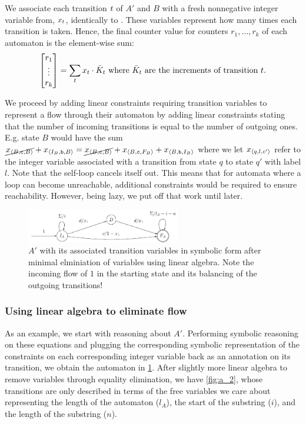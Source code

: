 We associate each transition $t$ of $A'$ and $B$ with a fresh
nonnegative integer variable from, $x_t$, identically to
\cite{generate-parikh-image}. These variables represent how many times each
transition is taken. Hence, the final counter value for counters $r_1, \ldots,
r_k$ of each automaton is the element-wise sum:
\begin{equation}\label{eq:counter-sums}
\begin{bmatrix} 
  r_1 \\
  \vdots\\
  r_k \\
\end{bmatrix} = \sum_t x_t \cdot 
  \bar{K}_t \text{ where $\bar{K}_t$ are the increments of transition $t$}.
\end{equation}

We proceed by adding linear constraints requiring transition variables to
represent a flow through their automaton by adding linear constraints stating
that the number of incoming transitions is equal to the number of outgoing ones.
E.g. state $B$ would have the sum $\cancel{x_{\left\langle B, \texttt{c}, B\right\rangle}} +
x_{\left\langle I_B, \texttt{b}, B\right\rangle} = \cancel{x_{\left\langle B, \texttt{c}, B\right\rangle}}  +
x_{\left\langle B, \texttt{c}, F_B\right\rangle} + x_{\left\langle B, \texttt{b}, I_B\right\rangle}$ where we let
$x_{\left\langle q, l, c'\right\rangle}$ refer to the integer variable associated with a
transition from state $q$ to state $q'$ with label $l$. Note that the self-loop
cancels itself out. This means that for automata where a loop can become
unreachable, additional constraints would be required to ensure reachability.
However, being lazy, we put off that work until later.

\begin{figure}[h]
  \centering 
  \includegraphics[width=0.6\textwidth]{a_1}
  \caption{ $A'$ with its associated transition variables in symbolic form after
  minimal elminiation of variables using linear algebra. Note the incoming flow
  of $1$ in the starting state and its balancing of the outgoing transitions!
  }\label{fig:a_1}
\end{figure}

\subsubsection{Using linear algebra to eliminate flow}
As an example, we start with reasoning about $A'$. Performing symbolic reasoning
on these equations and plugging the corresponding symbolic representation of the
constraints on each corresponding integer variable back as an annotation on its
transition, we obtain the automaton in \cref{fig:a_1}. After slightly more
linear algebra to remove variables through equality elimination, we have
\cref{fig:a_2}, whose transitions are only described in terms of the free
variables we care about representing the length of the automaton ($l_A$), the
start of the substring ($i$), and the length of the substring ($n$).

